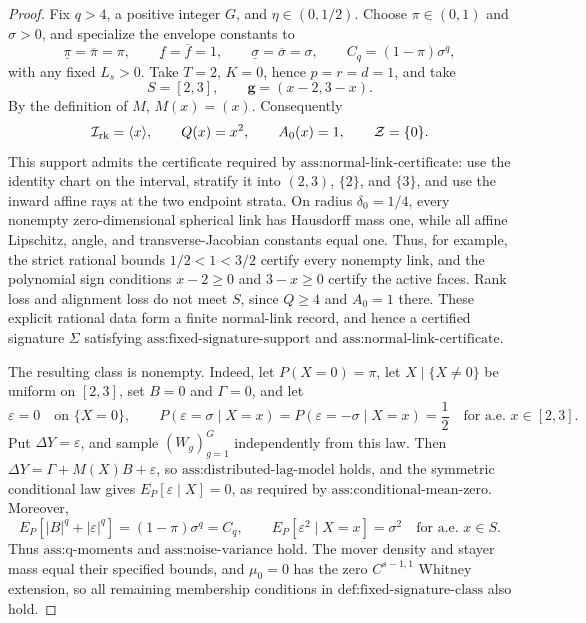 \documentclass{article}
\begin{document}
\begin{proof}
Fix \(q>4\), a positive integer \(G\), and \(\eta\in(0,1/2)\). Choose \(\pi\in(0,1)\) and \(\sigma>0\), and specialize the envelope constants to
\[
 \underline\pi=\overline\pi=\pi,
 \qquad
 \underline f=\overline f=1,
 \qquad
 \underline\sigma=\overline\sigma=\sigma,
 \qquad
 C_q=(1-\pi)\sigma^q,
\]
with any fixed \(L_s>0\). Take \(T=2\), \(K=0\), hence \(p=r=d=1\), and take
\[
 S=[2,3],\qquad \mathbf g=(x-2,3-x).
\]
By the definition of \(M\), \(M(x)=(x)\). Consequently
\[
 \mathcal I_{\rm rk}=\langle x\rangle,
 \qquad Q(x)=x^2,
 \qquad A_0(x)=1,
 \qquad \mathcal Z=\{0\}.
\]
This support admits the certificate required by \(\text{ass:normal-link-certificate}\): use the identity chart on the interval, stratify it into \((2,3)\), \(\{2\}\), and \(\{3\}\), and use the inward affine rays at the two endpoint strata. On radius \(\delta_0=1/4\), every nonempty zero-dimensional spherical link has Hausdorff mass one, while all affine Lipschitz, angle, and transverse-Jacobian constants equal one. Thus, for example, the strict rational bounds \(1/2<1<3/2\) certify every nonempty link, and the polynomial sign conditions \(x-2\ge0\) and \(3-x\ge0\) certify the active faces. Rank loss and alignment loss do not meet \(S\), since \(Q\ge4\) and \(A_0=1\) there. These explicit rational data form a finite normal-link record, and hence a certified signature \(\Sigma\) satisfying \(\text{ass:fixed-signature-support}\) and \(\text{ass:normal-link-certificate}\).

The resulting class is nonempty. Indeed, let \(P(X=0)=\pi\), let \(X\mid\{X\ne0\}\) be uniform on \([2,3]\), set \(B=0\) and \(\Gamma=0\), and let
\[
 \varepsilon=0\quad\text{on }\{X=0\},
 \qquad
 P(\varepsilon=\sigma\mid X=x)
 =P(\varepsilon=-\sigma\mid X=x)=\frac12
 \quad\text{for a.e. }x\in[2,3].
\]
Put \(\Delta Y=\varepsilon\), and sample \((W_g)_{g=1}^G\) independently from this law. Then \(\Delta Y=\Gamma+M(X)B+\varepsilon\), so \(\text{ass:distributed-lag-model}\) holds, and the symmetric conditional law gives \(E_P[\varepsilon\mid X]=0\), as required by \(\text{ass:conditional-mean-zero}\). Moreover,
\[
 E_P[|B|^q+|\varepsilon|^q]=(1-\pi)\sigma^q=C_q,
 \qquad
 E_P[\varepsilon^2\mid X=x]=\sigma^2
 \quad\text{for a.e. }x\in S.
\]
Thus \(\text{ass:q-moments}\) and \(\text{ass:noise-variance}\) hold. The mover density and stayer mass equal their specified bounds, and \(\mu_0=0\) has the zero \(C^{s-1,1}\) Whitney extension, so all remaining membership conditions in \(\text{def:fixed-signature-class}\) also hold.


\end{proof}
\end{document}
